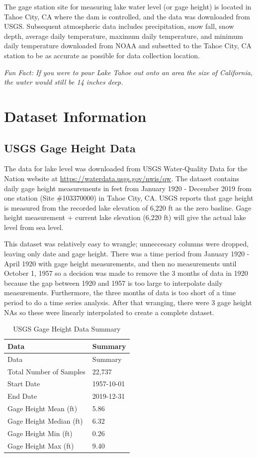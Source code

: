 \documentclass[12pt,]{article}
\begin{document}
The gage station site for measuring lake water level (or gage height) is
located in Tahoe City, CA where the dam is controlled, and the data was
downloaded from USGS. Subsequent atmospheric data includes
precipitation, snow fall, snow depth, average daily temperature, maximum
daily temperature, and minimum daily temperature downloaded from NOAA
and subsetted to the Tahoe City, CA station to be as accurate as
possible for data collection location.

\emph{Fun Fact: If you were to pour Lake Tahoe out onto an area the size
of California, the water would still be 14 inches deep.}

\newpage

\hypertarget{dataset-information}{%
\section{Dataset Information}\label{dataset-information}}

\hypertarget{usgs-gage-height-data}{%
\subsection{USGS Gage Height Data}\label{usgs-gage-height-data}}

The data for lake level was downloaded from USGS Water-Quality Data for
the Nation website at \url{https://waterdata.usgs.gov/nwis/qw}. The
dataset contains daily gage height measurements in feet from January
1920 - December 2019 from one station (Site \#103370000) in Tahoe City,
CA. USGS reports that gage height is measured from the recorded lake
elevation of 6,220 ft as the zero basline. Gage height measurement +
current lake elevation (6,220 ft) will give the actual lake level from
sea level.

This dataset was relatively easy to wrangle; unneccesary columns were
dropped, leaving only date and gage height. There was a time period from
January 1920 - April 1920 with gage height measurements, and then no
measurements until October 1, 1957 so a decision was made to remove the
3 months of data in 1920 because the gap between 1920 and 1957 is too
large to interpolate daily measurements. Furthermore, the three months
of data is too short of a time period to do a time series analysis.
After that wranging, there were 3 gage height NAs so these were linearly
interpolated to create a complete dataset.

\begin{longtable}[]{@{}ll@{}}
\caption{\label{tab:table} USGS Gage Height Data Summary}\tabularnewline
\toprule
Data & Summary\tabularnewline
\midrule
\endfirsthead
\toprule
Data & Summary\tabularnewline
\midrule
\endhead
Total Number of Samples & 22,737\tabularnewline
Start Date & 1957-10-01\tabularnewline
End Date & 2019-12-31\tabularnewline
Gage Height Mean (ft) & 5.86\tabularnewline
Gage Height Median (ft) & 6.32\tabularnewline
Gage Height Min (ft) & 0.26\tabularnewline
Gage Height Max (ft) & 9.40\tabularnewline
\bottomrule
\end{longtable}
\end{document}
